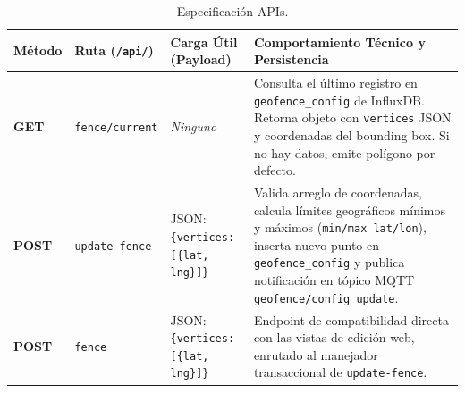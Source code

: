 \begin{table}[H]
\centering
\footnotesize
\begin{tabularx}{\textwidth}{@{}l l >{\raggedright\arraybackslash}p{3.8cm} >{\raggedright\arraybackslash}X@{}}
\toprule
\textbf{Método} & \textbf{Ruta (\texttt{/api/})} & \textbf{Carga Útil (Payload)} & \textbf{Comportamiento Técnico y Persistencia} \\ \midrule
\textbf{GET} & \texttt{fence/current} & \textit{Ninguno} & Consulta el último registro en \texttt{geofence\_config} de InfluxDB. Retorna objeto con \texttt{vertices} JSON y coordenadas del bounding box. Si no hay datos, emite polígono por defecto. \\ \addlinespace
\textbf{POST} & \texttt{update-fence} & JSON: \newline \texttt{\{vertices: [\{lat, lng\}]\}} & Valida arreglo de coordenadas, calcula límites geográficos mínimos y máximos (\texttt{min/max lat/lon}), inserta nuevo punto en \texttt{geofence\_config} y publica notificación en tópico MQTT \texttt{geofence/config\_update}. \\ \addlinespace
\textbf{POST} & \texttt{fence} & JSON: \newline \texttt{\{vertices: [\{lat, lng\}]\}} & Endpoint de compatibilidad directa con las vistas de edición web, enrutado al manejador transaccional de \texttt{update-fence}. \\ \bottomrule
\end{tabularx}
\caption{Especificación APIs.}
\label{tab:api_rest}
\end{table}

